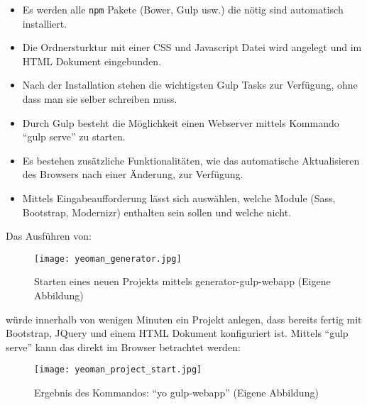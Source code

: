 		\begin{itemize}
			\item Es werden alle \texttt{npm} Pakete (Bower, Gulp usw.) die nötig sind automatisch installiert.
			\item Die Ordnersturktur mit einer CSS und Javascript Datei wird angelegt und im HTML Dokument eingebunden.
			\item Nach der Installation stehen die wichtigsten Gulp Tasks zur Verfügung, ohne dass man sie selber schreiben muss.
			\item Durch Gulp besteht die Möglichkeit einen Webserver mittels Kommando "`gulp serve"' zu starten.
			\item Es bestehen zusätzliche Funktionalitäten, wie das automatische Aktualisieren des Browsers nach einer Änderung, zur Verfügung.
			\item Mittels Eingabeaufforderung lässt sich auswählen, welche Module (Sass, Bootstrap, Modernizr) enthalten sein sollen und welche nicht.
		\end{itemize}

		Das Ausführen von:
		\begin{figure}[htbp]
			\begin{center}
				\texttt{[image: yeoman\_generator.jpg]}
				\caption{Starten eines neuen Projekts mittels generator-gulp-webapp (Eigene Abbildung)}
				\label{fig:yeoman_generator}
			\end{center}
		\end{figure}

		würde innerhalb von wenigen Minuten ein Projekt anlegen, dass bereits fertig mit Bootstrap, JQuery und einem HTML Dokument konfiguriert ist. Mittels "`gulp serve"' kann das direkt im Browser betrachtet werden:

		\begin{figure}[htbp]
			\begin{center}
				\texttt{[image: yeoman\_project\_start.jpg]}
				\caption{Ergebnis des Kommandos: "`yo gulp-webapp"' (Eigene Abbildung)}
				\label{fig:yeoman_project_start}
			\end{center}
		\end{figure}
				
